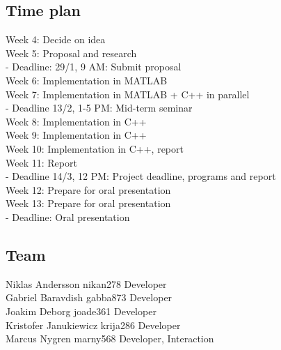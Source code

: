 \documentclass[a4paper,12pt,twoside,swedish]{report}
\begin{document}
\subsection{Time plan}
Week 4: Decide on idea \\
Week 5: Proposal and research \\
- Deadline: 29/1, 9 AM: Submit proposal \\
Week 6: Implementation in MATLAB \\
Week 7: Implementation in MATLAB + C++ in parallel \\
- Deadline 13/2, 1-5 PM: Mid-term seminar \\
Week 8: Implementation in C++ \\
Week 9: Implementation in C++ \\
Week 10: Implementation in C++, report \\
Week 11: Report \\
- Deadline 14/3, 12 PM: Project deadline, programs and report \\
Week 12: Prepare for oral presentation \\
Week 13: Prepare for oral presentation \\
- Deadline: Oral presentation

 \subsection{Team}
Niklas Andersson	nikan278	Developer\\
Gabriel Baravdish	gabba873	Developer\\
Joakim Deborg	joade361	Developer\\
Kristofer Janukiewicz	krija286	Developer\\
Marcus Nygren	marny568	Developer, Interaction
\end{document}
